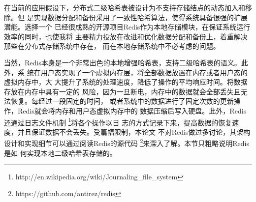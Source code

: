 在当前的应用假设下，分布式二级哈希表被设计为不支持存储结点的动态加入和移除。但
是实现数据分配和备份采用了一致性哈希算法，使得系统具备很强的扩展潜能。选择一个
已经很成熟的开源项目Redis作为本地存储模块，在保证系统运行效率的同时，也使我将
主要精力投放在改进和优化数据分配和备份上，着重解决那些在分布式存储系统中存在，
而在本地存储系统中不必考虑的问题。

当然，Redis本身是一个非常出色的本地增强哈希表，支持二级哈希表的语义。此外，系
统在用户态实现了一个虚拟内存层，将全部数据放置在内存或者用户态的虚拟内存中，大
大提升了系统的处理速度，降低了操作的平均响应时间。将数据存放在内存中具有一定的
风险，因为一旦断电，内存中的数据就会全部丢失且无法恢复。每经过一段固定的时间，
或者系统中的数据进行了固定次数的更新操作，Redis就会将内存和用户态虚拟内存中的
数据压缩后写入硬盘。此外，Redis还通过日志文件机制
\footnote{http://en.wikipedia.org/wiki/Journaling\_file\_system}将各个操作以日
志的方式记录下来，提高数据的恢复速度，并且保证数据不会丢失。受篇幅限制，本论文
不对Redis做过多讨论，其架构设计和实现细节可以通过阅读Redis的源代码
\footnote{https://github.com/antirez/redis}来深入了解。本节只粗略说明Redis是如
何实现本地二级哈希表存储的。

